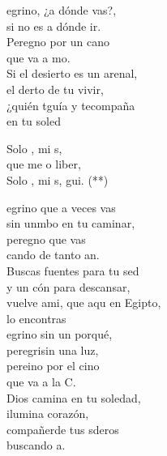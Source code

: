 \begin{cancion}%
	egrino, ¿a dónde vas?, \\
	si no es a dónde ir.\\
	Peregno por un cano \\
	que va a mo. \\
	\jump
Si el desierto es un arenal, \\
	el derto de tu vivir,\\
	¿quién tguía y tecompaña \\
	en tu soled  \jump\\
	\begin{chorus}%
		Solo , mi s,\\
		que me o liber,\\
		Solo , mi s, gui. (**) \jump\\
	\end{chorus}%
	egrino que a veces vas \\
	sin unmbo en tu caminar,\\
	peregno que vas \\
	cando de tanto an. \\
	\jump
Buscas fuentes para tu sed \\
	y un cón para descansar,\\
	vuelve ami, que aqu en Egipto, \\
	lo encontras \\
	\jump
	egrino sin un porqué,\\
	peregrisin una luz,\\
	pereino por el cino \\
	que va a la C. \\
	\jump
Dios camina en tu soledad,\\
	ilumina corazón,\\
	compañerde tus sderos \\
	buscando a. \\
	\jump
\end{cancion}%
